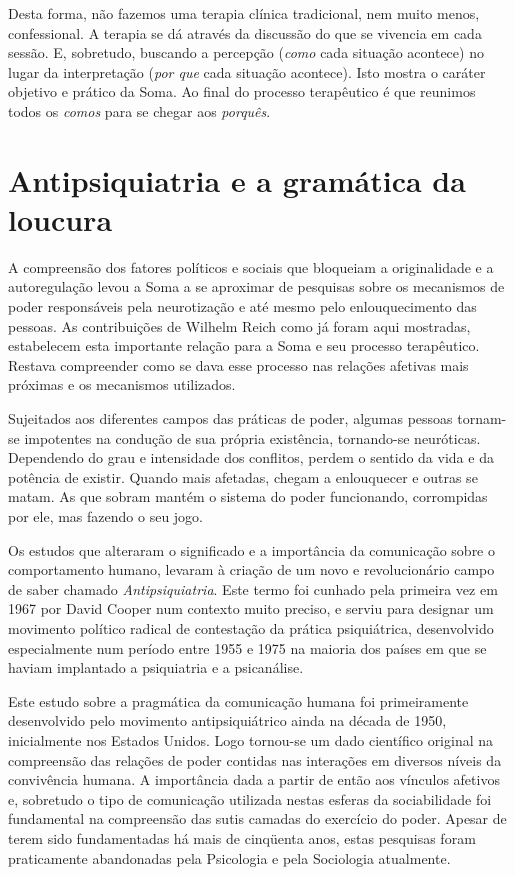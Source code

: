 Desta forma, não fazemos uma terapia clínica tradicional, nem muito
menos, confessional. A terapia se dá através da discussão do que se
vivencia em cada sessão. E, sobretudo, buscando a percepção (\emph{como}
cada situação acontece) no lugar da interpretação (\emph{por que} cada
situação acontece). Isto mostra o caráter objetivo e prático da Soma. Ao
final do processo terapêutico é que reunimos todos os \emph{comos} para
se chegar aos \emph{porquês}.

\section{Antipsiquiatria e a gramática da loucura}

A compreensão dos fatores políticos e sociais que bloqueiam a
originalidade e a autoregulação levou a Soma a se aproximar de pesquisas
sobre os mecanismos de poder responsáveis pela neurotização e até mesmo
pelo enlouquecimento das pessoas. As contribuições de Wilhelm Reich como
já foram aqui mostradas, estabelecem esta importante relação para a Soma
e seu processo terapêutico. Restava compreender como se dava esse
processo nas relações afetivas mais próximas e os mecanismos utilizados.

Sujeitados aos diferentes campos das práticas de poder, algumas pessoas
tornam-se impotentes na condução de sua própria existência, tornando-se
neuróticas. Dependendo do grau e intensidade dos conflitos, perdem o
sentido da vida e da potência de existir. Quando mais afetadas, chegam a
enlouquecer e outras se matam. As que sobram mantém o sistema do poder
funcionando, corrompidas por ele, mas fazendo o seu jogo.

Os estudos que alteraram o significado e a importância da comunicação
sobre o comportamento humano, levaram à criação de um novo e
revolucionário campo de saber chamado \emph{Antipsiquiatria}. Este termo
foi cunhado pela primeira vez em 1967 por David Cooper num contexto
muito preciso, e serviu para designar um movimento político radical de
contestação da prática psiquiátrica, desenvolvido especialmente num
período entre 1955 e 1975 na maioria dos países em que se haviam
implantado a psiquiatria e a psicanálise.

Este estudo sobre a pragmática da comunicação humana foi primeiramente
desenvolvido pelo movimento antipsiquiátrico ainda na década de 1950,
inicialmente nos Estados Unidos. Logo tornou-se um dado científico
original na compreensão das relações de poder contidas nas interações em
diversos níveis da convivência humana. A importância dada a partir de
então aos vínculos afetivos e, sobretudo o tipo de comunicação utilizada
nestas esferas da sociabilidade foi fundamental na compreensão das sutis
camadas do exercício do poder. Apesar de terem sido fundamentadas há
mais de cinqüenta anos, estas pesquisas foram praticamente abandonadas
pela Psicologia e pela Sociologia atualmente.

